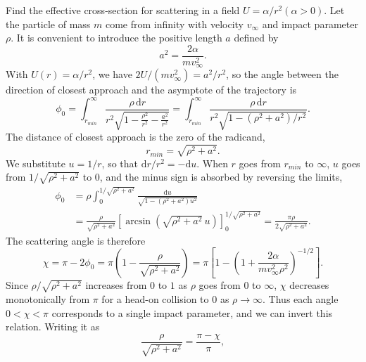 \begin{problem}[title={Scattering in a repulsive \texorplain{$\alpha/r^2$}{α/r²} field}]
{
Find the effective cross-section for scattering in a field $U=\alpha/r^2 \left(\alpha >0 \right)$.
}
{
Let the particle of mass $m$ come from infinity with velocity $v_\infty$ and impact parameter $\rho$. It is convenient to introduce the positive length $a$ defined by
\begin{equation*}
    a^2 = \frac{2\alpha}{mv_\infty^2}.
\end{equation*}
With $U(r) = \alpha/r^2$, we have $2U/(mv_\infty^2) = a^2/r^2$, so the angle between the direction of closest approach and the asymptote of the trajectory is
\begin{equation*}
    \phi_0 = \int_{r_{min}}^\infty \frac{\rho\,\mathrm{d}r}{r^2\sqrt{1 - \frac{\rho^2}{r^2} - \frac{a^2}{r^2}}} = \int_{r_{min}}^\infty \frac{\rho\,\mathrm{d}r}{r^2\sqrt{1 - (\rho^2 + a^2)/r^2}}.
\end{equation*}
The distance of closest approach is the zero of the radicand,
\begin{equation*}
    r_{min} = \sqrt{\rho^2 + a^2}.
\end{equation*}
We substitute $u = 1/r$, so that $\mathrm{d}r/r^2 = -\mathrm{d}u$. When $r$ goes from $r_{min}$ to $\infty$, $u$ goes from $1/\sqrt{\rho^2 + a^2}$ to $0$, and the minus sign is absorbed by reversing the limits,
\begin{align*}
    \phi_0 &= \rho\int_0^{1/\sqrt{\rho^2 + a^2}} \frac{\mathrm{d}u}{\sqrt{1 - (\rho^2 + a^2)u^2}} \\
    &= \frac{\rho}{\sqrt{\rho^2 + a^2}}\left[ \arcsin{\left( \sqrt{\rho^2 + a^2}\,u \right)} \right]_0^{1/\sqrt{\rho^2 + a^2}} = \frac{\pi\rho}{2\sqrt{\rho^2 + a^2}}.
\end{align*}
The scattering angle is therefore
\begin{equation*}
    \chi = \pi - 2\phi_0 = \pi\left( 1 - \frac{\rho}{\sqrt{\rho^2 + a^2}} \right) = \pi\left[ 1 - \left( 1 + \frac{2\alpha}{mv_\infty^2\rho^2} \right)^{-1/2} \right].
\end{equation*}
Since $\rho/\sqrt{\rho^2 + a^2}$ increases from $0$ to $1$ as $\rho$ goes from $0$ to $\infty$, $\chi$ decreases monotonically from $\pi$ for a head-on collision to $0$ as $\rho \to \infty$. Thus each angle $0 < \chi < \pi$ corresponds to a single impact parameter, and we can invert this relation. Writing it as
\begin{equation*}
    \frac{\rho}{\sqrt{\rho^2 + a^2}} = \frac{\pi - \chi}{\pi},

\end{equation*}}
\end{problem}
